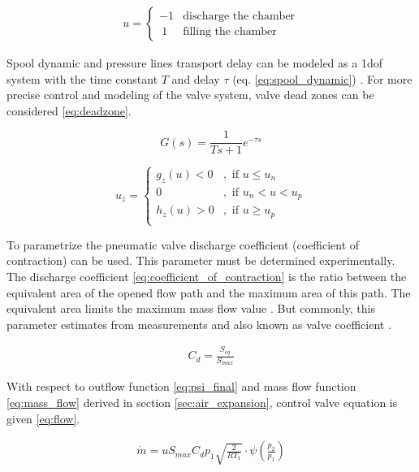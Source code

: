 \begin{align}
    u =
    \begin{cases}
        -1 & \text{discharge the chamber} \\
       \  1  & \text{filling the chamber} 
    \end{cases}
    \label{eq:input_u}
\end{align} 

Spool dynamic and pressure lines transport delay can be modeled as a 1dof
system with the time constant $T$ and delay $\tau$ (eq.
\ref{eq:spool_dynamic}) \cite{isermann_mech}. For more precise control and
modeling of the valve system, valve dead zones can be considered
\ref{eq:deadzone}.

\begin{equation}
    G(s) = \frac{1}{T s + 1}e^{-\tau s}
    \label{eq:spool_dynamic}
\end{equation}


\begin{equation}
    u_z = 
    \begin{cases}
        g_z(u) < 0 &, \text{ if } u \le u_n \\
        0          &, \text{ if } u_n < u < u_p \\
        h_z(u) > 0 &, \text{ if } u \ge u_p \\
    \end{cases}  
    \label{eq:deadzone}
\end{equation}



To parametrize the pneumatic valve discharge coefficient (coefficient of
contraction) can be used. This parameter must be determined experimentally.
The discharge coefficient \ref{eq:coefficient_of_contraction} is the ratio
between the equivalent area of the opened flow path and the maximum area of
this path. The equivalent area limits the maximum mass flow value
\cite{valves_chambers}. But commonly, this parameter estimates from
measurements and also known as valve coefficient \cite{fluid}.

\begin{align}
    C_d = \frac{S_{eq}}{S_{max}}
    \label{eq:coefficient_of_contraction}
\end{align}

With respect to outflow function \ref{eq:psi_final} and mass flow function
\ref{eq:mass_flow} derived in section \ref{sec:air_expansion},  control
valve equation is given \ref{eq:flow}.

\begin{align}
    \dot{m} = u S_{max} C_d p_1 \sqrt{\frac{2}{RT_1}}
    \cdot \psi\left(\frac{p_2}{p_1}\right)
    \label{eq:flow}
\end{align}

